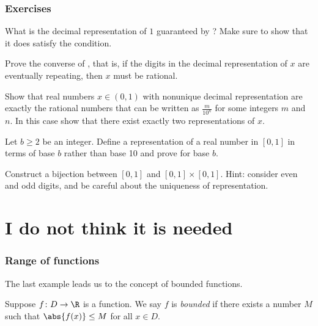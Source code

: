 \documentclass[12pt]{book}
\begin{document}
\subsection*{Exercises}

\begin{exercise}[Easy]
What is the decimal representation of $1$ guaranteed by
?
  Make sure to show that it does satisfy
the condition.
\end{exercise}

\begin{exercise}
Prove the converse of , that is,
if the digits in the decimal representation of $x$ are eventually repeating, then 
$x$ must be rational.
\end{exercise}

\begin{exercise}
Show that real numbers $x \in (0,1)$ with nonunique decimal representation
are exactly the rational numbers that can be written
as $\frac{m}{10^n}$ for some integers $m$ and $n$.
In this case show that
there exist exactly two representations of $x$.
\end{exercise}

\begin{exercise}\label{ex:binary}
Let $b \geq 2$ be an integer.
Define a representation of a real number in
$[0,1]$ in terms of base $b$ rather than base 10 and prove
 for base $b$.
\end{exercise}

\begin{exercise}\label{exercise:RxR}
Construct a bijection between $[0,1]$ and $[0,1] \times [0,1]$.  Hint:
consider even and odd digits, and be careful about the uniqueness of
representation.
\end{exercise}

\chapter{I do not think it is needed}

\subsection*{Range of functions}

The last example leads us to the concept of bounded functions.

\begin{defn}
Suppose $f \colon D \to \R$ is a function.
We say $f$ is
\emph{bounded}
if there exists a number $M$
such that $\abs{f(x)} \leq M$ for all $x \in D$.
\end{defn}
\end{document}

